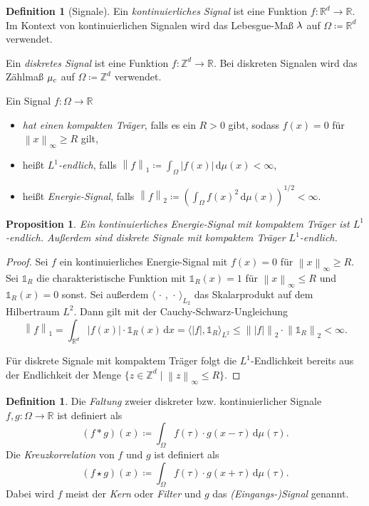 \documentclass{article}
\newtheorem{proposition}[theorem]{Proposition}
\theoremstyle{definition}
\newtheorem{definition}[theorem]{Definition}
\newcommand{\R}{\mathbb{R}}
\newcommand{\Z}{\mathbb{Z}}
\newcommand{\diff}{\,\textrm{d}}
\newcommand{\norm}[1]{\left\lVert#1\right\rVert}
\newcommand{\abs}[1]{\left\lvert#1\right\rvert}
\begin{document}
\begin{definition}[Signale]
    Ein \emph{kontinuierliches Signal} ist eine Funktion $f: \R^d\rightarrow \R$.
    Im Kontext von kontinuierlichen Signalen wird das Lebesgue-Maß $\lambda$ auf $\Omega\coloneqq \R^d$ verwendet.

    Ein \emph{diskretes Signal} ist eine Funktion $f: \Z^d \rightarrow \R$.
    Bei diskreten Signalen wird das Zählmaß $\mu_c$ auf $\Omega\coloneqq \Z^d$ verwendet.

    Ein Signal $f: \Omega \rightarrow \R$
    \begin{itemize}
        \item \emph{hat einen kompakten Träger}, falls es ein $R > 0$ gibt, sodass $f(x) = 0$ für $\norm{x}_\infty \geq R$ gilt,
        \item heißt \emph{$L^1$-endlich}, falls $\norm{f}_1 \coloneqq \int_{\Omega} \abs{f(x)} \diff \mu(x) < \infty$,
        \item heißt \emph{Energie-Signal}, falls $\norm{f}_2 \coloneqq \left(\int_{\Omega} f(x)^2 \diff \mu(x) \right)^{1/2} < \infty$.
    \end{itemize}
\end{definition}

\begin{proposition}
    Ein kontinuierliches Energie-Signal mit kompaktem Träger ist $L^1$-endlich.
    Außerdem sind diskrete Signale mit kompaktem Träger $L^1$-endlich.
\end{proposition}
\begin{proof}
    Sei $f$ ein kontinuierliches Energie-Signal mit $f(x) = 0$ für $\norm{x}_{\infty} \geq R$.
    Sei $\mathbb{1}_R$ die charakteristische Funktion mit $\mathbb{1}_R(x) = 1$ für $\norm{x}_\infty \leq R$ und $\mathbb{1}_R(x) = 0$ sonst.
    Sei außerdem $\langle \,\cdot\, , \,\cdot\, \rangle_{L_2}$ das Skalarprodukt auf dem Hilbertraum $L^2$.
    Dann gilt mit der Cauchy-Schwarz-Ungleichung
    \[
        \norm{f}_1 
        = \int_{\R^d} \abs{f(x)} \cdot \mathbb{1}_R(x) \diff x
        = \langle \abs{f}, \mathbb{1}_R \rangle_{L^2}
        \leq \norm{\abs{f}}_2 \cdot \norm{\mathbb{1}_R}_2 < \infty .
    \]

    Für diskrete Signale mit kompaktem Träger folgt die $L^1$-Endlichkeit bereits aus der Endlichkeit der Menge $\{ z\in\Z^d \mid \norm{z}_{\infty} \leq R\}$.
\end{proof}

\begin{definition}
    Die \emph{Faltung} zweier diskreter bzw. kontinuierlicher Signale $f,g: \Omega\rightarrow \R$ ist definiert als 
    \[
        (f * g)(x) \coloneqq \int_\Omega f(\tau) \cdot g(x-\tau) \diff \mu(\tau).
    \]
    Die \emph{Kreuzkorrelation} von $f$ und $g$ ist definiert als
    \[
        (f \star g)(x) \coloneqq \int_\Omega f(\tau) \cdot g(x+\tau) \diff \mu(\tau).
    \]
    Dabei wird $f$ meist der \emph{Kern} oder \emph{Filter} und $g$ das \emph{(Eingangs-)Signal} genannt.
\end{definition}
\end{document}
